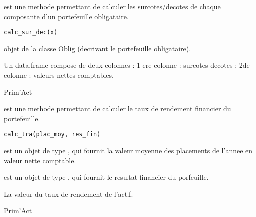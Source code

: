 \documentclass[a4paper]{book}
\begin{document}
%
\begin{Description}\relax
{} est une methode permettant de calculer les surcotes/decotes de chaque composante d'un portefeuille obligataire.
\end{Description}
%
\begin{Usage}
\begin{verbatim}
calc_sur_dec(x)
\end{verbatim}
\end{Usage}
%
\begin{Arguments}
\begin{ldescription}
\item[\code{x}] objet de la classe Oblig (decrivant le portefeuille obligataire).
\end{ldescription}
\end{Arguments}
%
\begin{Value}
Un data.frame compose de deux colonnes : 1 ere colonne : surcotes decotes ; 2de colonne : valeurs nettes comptables.
\end{Value}
%
\begin{Author}\relax
Prim'Act
\end{Author}
%
\begin{Description}\relax
{} est une methode permettant de calculer le taux de rendement financier du portefeuille.
\end{Description}
%
\begin{Usage}
\begin{verbatim}
calc_tra(plac_moy, res_fin)
\end{verbatim}
\end{Usage}
%
\begin{Arguments}
\begin{ldescription}
\item[\code{plac\_moy}] est un objet de type , qui fournit la valeur moyenne
des placements de l'annee en valeur nette comptable.

\item[\code{res\_fin}] est un objet de type , qui fournit le resultat financier du porfeuille.
\end{ldescription}
\end{Arguments}
%
\begin{Value}
La valeur du taux de rendement de l'actif.
\end{Value}
%
\begin{Author}\relax
Prim'Act
\end{Author}
\end{document}
